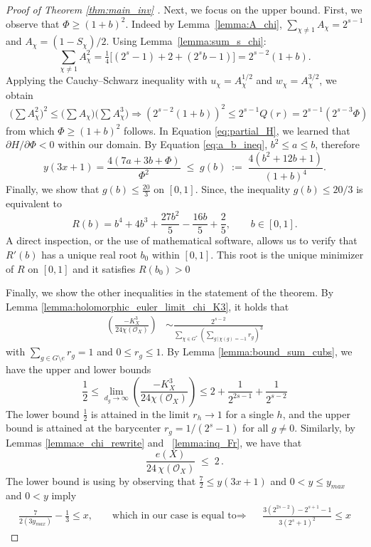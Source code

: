 \documentclass[12pt,twoside,]{amsart}
\theoremstyle{plain}
\theoremstyle{definition}
\begin{document}
\begin{proof}[Proof of Theorem \ref{thm:main_inv} ]
Next, we focus on the upper bound. 
First, we observe that $\Phi \geq (1+b)^2$. Indeed
by Lemma~\ref{lemma:A_chi},
$\sum_{\chi \neq 1} A_\chi = 2^{s-1}$ and 
 $A_\chi = (1 - S_\chi)/2$. Using
Lemma~\ref{lemma:sum_s_chi}:
\[
\sum_{\chi \neq 1} A_\chi^2
= \tfrac{1}{4}\bigl[(2^s-1) + 2 + (2^s b - 1)\bigr]
= 2^{s-2}(1+b).
\]
Applying the Cauchy--Schwarz inequality with
$u_\chi = A_\chi^{1/2}$ and $w_\chi = A_\chi^{3/2}$, we obtain
\begin{align*}
 \bigl(\sum A_\chi^2\bigr)^2
\leq \bigl(\sum A_\chi\bigr)\bigl(\sum A_\chi^3\bigr)   
\Longrightarrow
\left( 2^{s-2}(1+b) \right)^2 \leq 
2^{s-1}Q(r)
= 2^{s-1} \left( 2^{s-3}\Phi \right)
\end{align*}
from which $\Phi \geq (1+b)^2$ follows.
In Equation \eqref{eq:partial_H}, we learned that 
$\partial H/\partial\Phi < 0$ within our domain. By Equation \ref{eq:a_b_ineq}, 
$b^2 \leq a \leq b$, therefore
\[
y(3x+1) 
=
\frac{4(7a+3b+\Phi)}{\Phi^2}
\;\leq\; g(b) \;:=\;
  \frac{4(b^2 + 12b + 1)}{(1+b)^4}.
\]
Finally, we show that $g(b) \leq \frac{20}{3}$ on $[0,1]$. Since, the inequality $g(b) \leq 20/3$ is equivalent to
\[
R(b) =
b^4 + 4 b^3 + \frac{27 b^2}{5} - 
\frac{16 b}{5} + \frac{2}{5}
,\qquad b \in [0,1].
\]
A direct inspection, or the use of mathematical software, allows us to verify that $R'(b)$ has a unique real root $b_0$ within $[0,1]$. This root is the unique minimizer of $R$ on $[0,1]$ and it satisfies $R(b_0) > 0$

Finally, we show the other inequalities in the statement of the theorem.  By Lemma \ref{lemma:holomorphic_euler_limit_chi_K3}, it holds that 
\begin{align}\label{eq:ratio_K3_chi}
 \left( \frac{-K_X^3}{24\chi(\mathcal{O}_X)} \right) 
 &\sim
 \frac{2^{s-2}}{ 
 \sum_{\chi \in G^*} 
  \left( 
  \sum_{g \, | \, \chi(g) = - 1}   
  r_g
  \right)^3}
 \end{align}
 with $\sum_{g \in G \setminus e}  r_g = 1$ and $0 \leq r_g \leq 1$. 
By Lemma
\ref{lemma:bound_sum_cubs}, we have 
the upper and lower bounds 
\[
\frac{1}{2}
\leq
 \lim_{d_g \rightarrow \infty}
\left( \frac{-K_X^3}{24\chi(\mathcal{O}_X)} \right)
\leq 
2+ \frac{1}{2^{2s-1}} + \frac{1}{2^{s-2}}
\]
The lower bound $\tfrac{1}{2}$ is attained in the limit
$r_h \to 1$ for a single $h$, and the upper bound is attained
at the barycenter $r_g = 1/(2^s - 1)$ for all $g \neq 0$.  Similarly, by Lemmas \ref{lemma:e_chi_rewrite} and ~\ref{lemma:inq_Fr}, we have that
\[
  \frac{e(X)}{24\,\chi(\mathcal{O}_X)}
  \;\leq\;
  2\,.
\]
The lower bound is using by observing that
$\frac{7}{2} \leq y(3x+1)$ and 
$0 < y \leq y_{max}$ and $0 < y$ imply 
\begin{align*}
\frac{7}{2(3y_{max})} -\frac{1}{3} \leq x,
&&
\text{ which in our case is equal to} \Rightarrow
&&
\frac{3 (2^{2 s-2}) - 2^{s + 1} - 1}{3 (2^s + 1)^2}
\leq x
\end{align*}
\end{proof}
\end{document}
